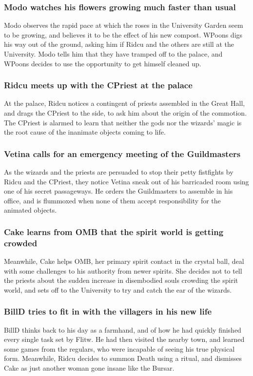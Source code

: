 \subsubsection{\Gls{Modo} watches his flowers growing much faster than usual}
\Gls{Modo} observes the rapid pace at which the roses in the University Garden seem to be growing,
and believes it to be the effect of his new compost. \Gls{WPoons} digs his way out of the ground,
asking him if \Gls{Ridcu} and the others are still at the University. \Gls{Modo} tells him that they
have tramped off to the palace, and \Gls{WPoons} decides to use the opportunity to get himself
cleaned up.

\subsubsection{\Gls{Ridcu} meets up with the \Gls{CPriest} at the palace}
At the palace, \Gls{Ridcu} notices a contingent of priests assembled in the Great Hall, and drags
the \Gls{CPriest} to the side, to ask him about the origin of the commotion. The \Gls{CPriest}
is alarmed to learn that neither the gods nor the wizards' magic is the root cause of the
inanimate objects coming to life.

\subsubsection{\Gls{Vetina} calls for an emergency meeting of the Guildmasters}
As the wizards and the priests are persuaded to stop their petty fistfights by \Gls{Ridcu} and the
\Gls{CPriest}, they notice \Gls{Vetina} sneak out of his barricaded room using one of his secret
passageways. He orders the Guildmasters to assemble in his office, and is flummoxed when none of
them accept responsibility for the animated objects.

\subsubsection{\Gls{Cake} learns from \Gls{OMB} that the spirit world is getting crowded}
Meanwhile, \Gls{Cake} helps \Gls{OMB}, her primary spirit contact in the crystal ball, deal with
some challenges to his authority from newer spirits. She decides not to tell the priests about the
sudden increase in disembodied souls crowding the spirit world, and sets off to the University to
try and catch the ear of the wizards.

\subsubsection{\Gls{BillD} tries to fit in with the villagers in his new life}
\Gls{BillD} thinks back to his day as a farmhand, and of how he had quickly finished every single
task set by \Gls{Flitw}. He had then visited the nearby town, and learned some games from the
regulars, who were incapable of seeing his true physical form. Meanwhile, \Gls{Ridcu} decides to
summon \Gls{Death} using a ritual, and dismisses \Gls{Cake} as just another woman gone insane like
the \Gls{Bursar}.

